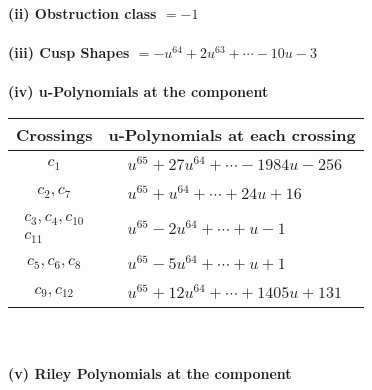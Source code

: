 \documentclass[1p]{elsarticle_modified}
\theoremstyle{definition}
\begin{document}
\flushleft \textbf{(ii) Obstruction class $= -1$}\\~\\
\flushleft \textbf{(iii) Cusp Shapes $= - u^{64}+2 u^{63}+\cdots-10 u-3$}\\~\\
\newpage\renewcommand{\arraystretch}{1}
\flushleft \textbf{(iv) u-Polynomials at the component}\newline \\
\begin{tabular}{m{50pt}|m{274pt}}
Crossings & \hspace{64pt}u-Polynomials at each crossing \\
\hline $$\begin{aligned}c_{1}\end{aligned}$$&$\begin{aligned}
&u^{65}+27 u^{64}+\cdots-1984 u-256
\end{aligned}$\\
\hline $$\begin{aligned}c_{2},c_{7}\end{aligned}$$&$\begin{aligned}
&u^{65}+u^{64}+\cdots+24 u+16
\end{aligned}$\\
\hline $$\begin{aligned}c_{3},c_{4},c_{10}\\c_{11}\end{aligned}$$&$\begin{aligned}
&u^{65}-2 u^{64}+\cdots+u-1
\end{aligned}$\\
\hline $$\begin{aligned}c_{5},c_{6},c_{8}\end{aligned}$$&$\begin{aligned}
&u^{65}-5 u^{64}+\cdots+u+1
\end{aligned}$\\
\hline $$\begin{aligned}c_{9},c_{12}\end{aligned}$$&$\begin{aligned}
&u^{65}+12 u^{64}+\cdots+1405 u+131
\end{aligned}$\\
\hline
\end{tabular}\\~\\
\newpage\renewcommand{\arraystretch}{1}
\flushleft \textbf{(v) Riley Polynomials at the component}\newline \\
\end{document}
